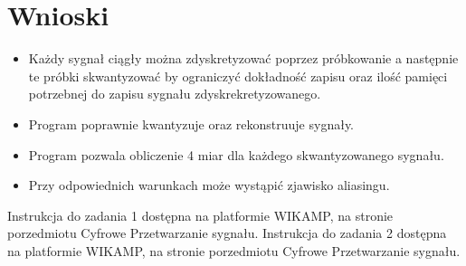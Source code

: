 \documentclass[12pt]{article}
\begin{document}

\section{Wnioski}
\begin{itemize}
    \item Każdy sygnał ciągły można zdyskretyzować poprzez próbkowanie a następnie te próbki skwantyzować by ograniczyć dokładność zapisu oraz ilość pamięci potrzebnej do zapisu sygnału zdyskrekretyzowanego.
    \item Program poprawnie kwantyzuje oraz rekonstruuje sygnały.
    \item Program pozwala obliczenie 4 miar dla każdego skwantyzowanego sygnału.
    \item Przy odpowiednich warunkach może wystąpić zjawisko aliasingu.
\end{itemize}
 


\renewcommand\refname{Bibliografia}



 Instrukcja do zadania 1 dostępna na platformie WIKAMP, na stronie porzedmiotu Cyfrowe Przetwarzanie sygnału.
 Instrukcja do zadania 2 dostępna na platformie WIKAMP, na stronie porzedmiotu Cyfrowe Przetwarzanie sygnału.
\end{document}
